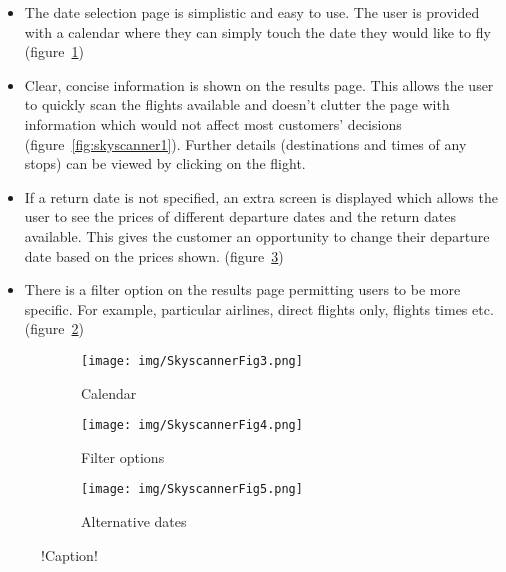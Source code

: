 \begin{itemize}
	\item The date selection page is simplistic and easy to use. The user is
		provided with a calendar where they can simply touch the date they
		would like to fly (figure~\ref{fig:skyscannerfig3})
	\item Clear, concise information is shown on the results page. This allows
		the user to quickly scan the flights available and doesn't clutter the
		page with information which would not affect most customers' decisions
		(figure~\ref{fig:skyscanner1}). Further details (destinations and times
		of any stops) can be viewed by clicking on the flight.
	\item If a return date is not specified, an extra screen is displayed which
		allows the user to see the prices of different departure dates and the
		return dates available. This gives the customer an opportunity to
		change their departure date based on the prices shown.
		(figure~\ref{fig:skyscannerfig5})
	\item There is a filter option on the results page permitting users to be
		more specific. For example, particular airlines, direct flights only,
		flights times etc. (figure~\ref{fig:skyscannerfig4})
\end{itemize}

\begin{figure}[ht]
        \centering
        \begin{subfigure}[b]{0.2\textwidth}
            \texttt{[image: img/SkyscannerFig3.png]}
            \caption{Calendar}\label{fig:skyscannerfig3}
        \end{subfigure}
        \qquad
        \begin{subfigure}[b]{0.2\textwidth}
            \texttt{[image: img/SkyscannerFig4.png]}
            \caption{Filter options}\label{fig:skyscannerfig4}
        \end{subfigure}
        \qquad
        \begin{subfigure}[b]{0.2\textwidth}
            \texttt{[image: img/SkyscannerFig5.png]}
            \caption{Alternative dates}\label{fig:skyscannerfig5}
        \end{subfigure}
        \caption{!Caption!}\label{fig:skyscanner2}
\end{figure}


